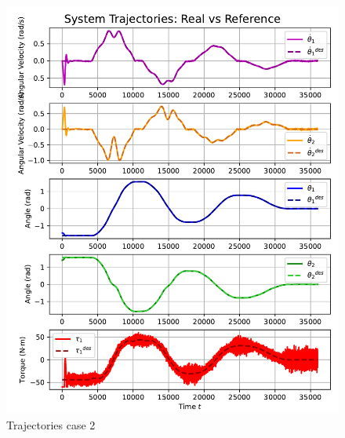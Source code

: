 \begin{figure}[htb]
    \centering
    \includegraphics[width=1\linewidth]{img/4-task4/MPC2.pdf}
    \caption{Trajectories case 2}
    \label{fig:dtheta1-evolution}
\end{figure}


